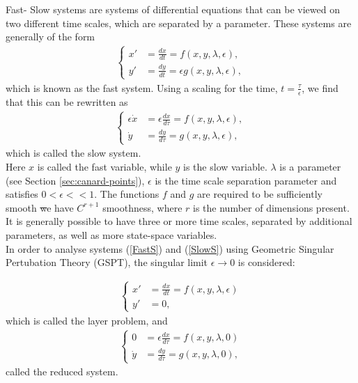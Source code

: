Fast- Slow systems are systems of differential equations that can be viewed on two different time scales, which are separated by a parameter.
These systems are generally of the form
\begin{align}
\begin{cases}
x' &=\frac{dx}{dt}= f(x,y,\lambda, \epsilon),\\
y' &= \frac{dy}{dt}= \epsilon g( x,y, \lambda, \epsilon),
\end{cases}\label{FastS}
\end{align}
which is known as the fast system.
Using a scaling for the time, $t = \frac{\tau}{\epsilon} $, we find that this can be rewritten as
\begin{align}
\begin{cases}
\epsilon \dot{x} &= \epsilon \frac{dx}{d \tau} = f(x,y,\lambda, \epsilon),\\
\dot{y} & = \frac{dy}{d \tau} =  g( x,y, \lambda, \epsilon),
\end{cases}\label{SlowS}
\end{align}
which is called the slow system.\\

Here $x$ is called the fast variable, while $y$ is the slow variable. $\lambda$ is a parameter (see Section \ref{sec:canard-points}), $\epsilon$ is the time scale separation parameter and satisfies $0< \epsilon << 1$. The functions $f$ and $g$ are required to be sufficiently smooth \st we have $ C^{r+1} $ smoothness, where $ r $ is the number of dimensions present. It is generally possible to have three or more time scales, separated by additional parameters, as well as more state-space variables. \\

In order to analyse systems (\ref{FastS}) and (\ref{SlowS}) using Geometric Singular Pertubation Theory (GSPT), the singular limit $\epsilon \to 0$ is considered:

\begin{align} \label{FastS0}
\begin{cases}
x' &=\frac{dx}{dt}= f(x,y,\lambda, \epsilon)\\
y' &= 0,
\end{cases}
\end{align}
which is called the layer problem, and
\begin{align}\label{SlowS0}
\begin{cases}
0 &= \epsilon \frac{dx}{d \tau} = f(x,y,\lambda, 0)\\
\dot{y} & = \frac{dy}{d \tau} =  g( x,y, \lambda,0),
\end{cases}
\end{align}
called the reduced system.\\

